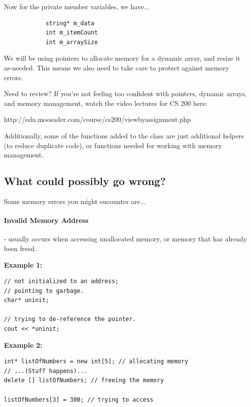 \documentclass[a4paper,12pt]{book}
\begin{document}
        Now for the private member variables, we have...
        \begin{verbatim}
            string* m_data
            int m_itemCount
            int m_arraySize
        \end{verbatim}

        We will be using pointers to allocate memory for a dynamic array,
        and resize it as-needed. This means we also need to take care to
        protect against memory errors.

        \begin{hint}{Need to review?}
            If you're not feeling too confident with pointers, dynamic arrays,
            and memory management, watch the video lectures for CS 200 here:

            http://edu.moosader.com/course/cs200/viewbyassignment.php
        \end{hint}

        Additionally, some of the functions added to the class are just additional
        helpers (to reduce duplicate code), or functions needed for working
        with memory management.

    \subsection*{What could possibly go wrong?}

        Some memory errors you might encounter are...

        \paragraph{Invalid Memory Address} - usually occurs when accessing
        unallocated memory, or memory that has already been freed.

        \textbf{Example 1:}

\begin{lstlisting}[style=code]
// not initialized to an address;
// pointing to garbage.
char* uninit;

// trying to de-reference the pointer.
cout << *uninit;
\end{lstlisting}

        \textbf{Example 2:}

\begin{lstlisting}[style=code]
int* listOfNumbers = new int[5]; // allocating memory
// ...(Stuff happens)...
delete [] listOfNumbers; // freeing the memory

listOfNumbers[3] = 300; // trying to access
\end{lstlisting}
\end{document}
